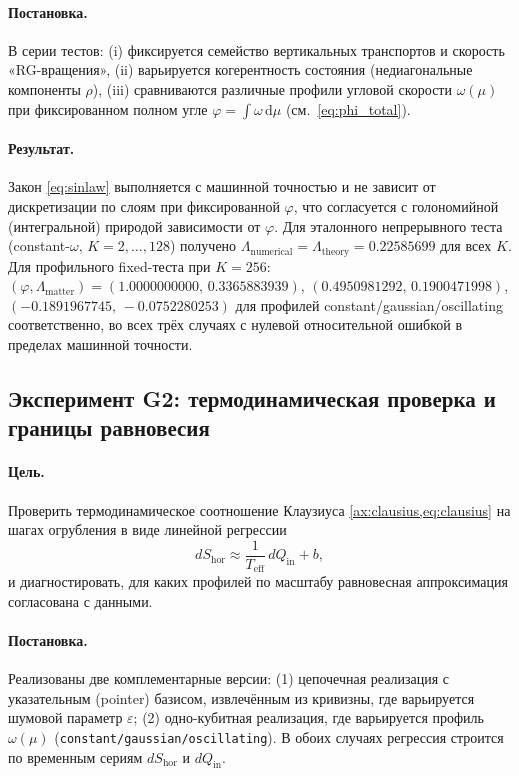 \documentclass[11pt,a4paper]{article}
\newcommand{\dd}{\mathrm{d}}
\theoremstyle{definition}
\theoremstyle{plain}
\theoremstyle{remark}
\begin{document}
\paragraph{Постановка.}
В серии тестов:
(i) фиксируется семейство вертикальных транспортов и скорость «RG-вращения»,
(ii) варьируется когерентность состояния (недиагональные компоненты $\rho$),
(iii) сравниваются различные профили угловой скорости $\omega(\mu)$ при фиксированном полном угле
$\varphi=\int \omega\,\dd\mu$ (см.\ \cref{eq:phi_total}).

\paragraph{Результат.}
Закон \cref{eq:sinlaw} выполняется с машинной точностью и не зависит от дискретизации по слоям при фиксированной $\varphi$,
что согласуется с голономийной (интегральной) природой зависимости от $\varphi$.
Для эталонного непрерывного теста (constant-$\omega$, $K=2,\dots,128$) получено
$\Lambda_{\mathrm{numerical}}=\Lambda_{\mathrm{theory}}=0.22585699$ для всех $K$.
Для профильного fixed-теста при $K=256$:
$(\varphi,\Lambda_{\mathrm{matter}})=
(1.0000000000,\,0.3365883939)$,
$(0.4950981292,\,0.1900471998)$,
$(-0.1891967745,\,-0.0752280253)$
для профилей constant/gaussian/oscillating соответственно, во всех трёх случаях с нулевой относительной ошибкой
в пределах машинной точности.

\subsection{Эксперимент G2: термодинамическая проверка и границы равновесия}
\label{sec:numerics:G2}

\paragraph{Цель.}
Проверить термодинамическое соотношение Клаузиуса \cref{ax:clausius,eq:clausius} на шагах огрубления
в виде линейной регрессии
\begin{equation}\label{eq:Clausius_fit}
dS_{\mathrm{hor}} \approx \frac{1}{T_{\mathrm{eff}}}\, dQ_{\mathrm{in}} + b,
\end{equation}
и диагностировать, для каких профилей по масштабу равновесная аппроксимация согласована с данными.

\paragraph{Постановка.}
Реализованы две комплементарные версии:
(1) цепочечная реализация с указательным (pointer) базисом, извлечённым из кривизны, где варьируется шумовой параметр $\varepsilon$;
(2) одно-кубитная реализация, где варьируется профиль $\omega(\mu)$ (\texttt{constant/gaussian/oscillating}).
В обоих случаях регрессия строится по временным сериям $dS_{\mathrm{hor}}$ и $dQ_{\mathrm{in}}$.
\end{document}
